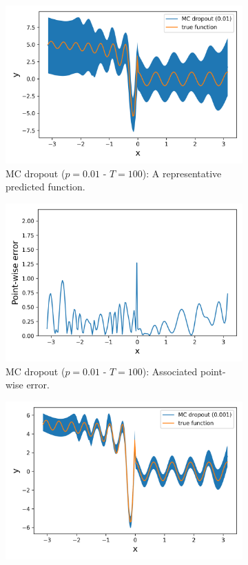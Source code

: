 \begin{figure}[H]
	\begin{subfigure}{.45\textwidth}
		\centering
		\includegraphics[width=1\linewidth]{./figs/mcdrop_01_rep_fun.png}  
		\caption{MC dropout ($p = 0.01$ - $T=100$): A representative predicted function.}
	\end{subfigure}
	\begin{subfigure}{.45\textwidth}
		\centering
		\includegraphics[width=1\linewidth]{./figs/mcdrop_01_err.png}  
		\caption{MC dropout ($p = 0.01$ - $T=100$): Associated point-wise error.}
	\end{subfigure}
	\begin{subfigure}{.45\textwidth}
		\centering
		\includegraphics[width=1\linewidth]{./figs/mcdrop_001_rep_fun.png}  

\end{subfigure}
\end{figure}
